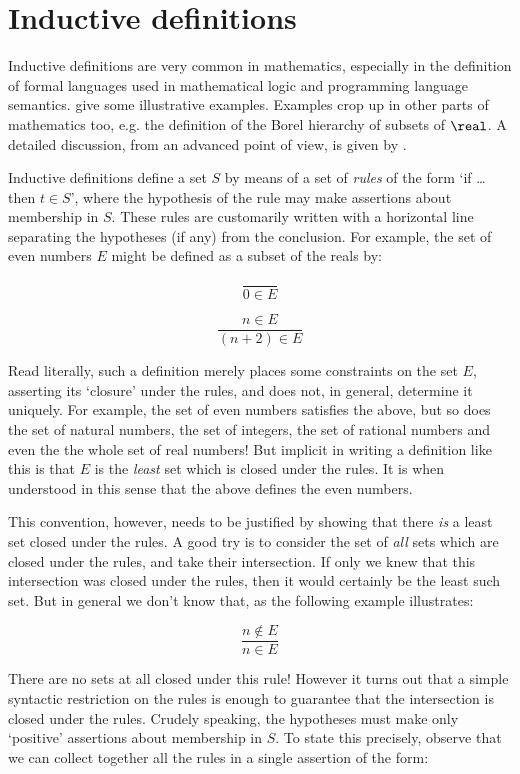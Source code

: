 \chapter{Inductive definitions}

Inductive definitions are very common in mathematics, especially in the
definition of formal languages used in mathematical logic and programming
language semantics.  give some
illustrative examples. Examples crop up in other parts of mathematics too, e.g.
the definition of the Borel hierarchy of subsets of $\real$. A detailed
discussion, from an advanced point of view, is given by .

Inductive definitions define a set $S$ by means of a set of {\em rules} of the
form `if \ldots then $t \in S$', where the hypothesis of the rule may make
assertions about membership in $S$. These rules are customarily written with a
horizontal line separating the hypotheses (if any) from the conclusion. For
example, the set of even numbers $E$ might be defined as a subset of the reals
by:

$$ \frac{}{0 \in E} $$

$$ \frac{n \in E}{(n + 2) \in E} $$

Read literally, such a definition merely places some constraints on the set
$E$, asserting its `closure' under the rules, and does not, in general,
determine it uniquely. For example, the set of even numbers satisfies the
above, but so does the set of natural numbers, the set of integers, the set of
rational numbers and even the the whole set of real numbers! But implicit in
writing a definition like this is that $E$ is the {\em least} set which is
closed under the rules. It is when understood in this sense that the above
defines the even numbers.

This convention, however, needs to be justified by showing that there {\em is}
a least set closed under the rules. A good try is to consider the set of {\em
all} sets which are closed under the rules, and take their intersection. If
only we knew that this intersection was closed under the rules, then it would
certainly be the least such set. But in general we don't know that, as the
following example illustrates:

$$ \frac{n \not\in E}{n \in E} $$

There are no sets at all closed under this rule! However it turns out that a
simple syntactic restriction on the rules is enough to guarantee that the
intersection is closed under the rules. Crudely speaking, the hypotheses must
make only `positive' assertions about membership in $S$. To state this
precisely, observe that we can collect together all the rules in a single
assertion of the form:

